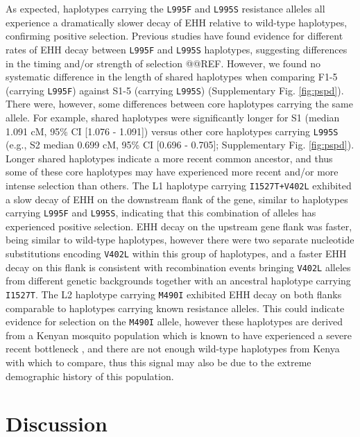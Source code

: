\documentclass[a4paper,11pt,abstracton,hidelinks]{scrartcl}
\begin{document}
%
As expected, haplotypes carrying the \texttt{L995F} and \texttt{L995S} resistance alleles all experience a dramatically slower decay of EHH relative to wild-type haplotypes, confirming positive selection.
%
Previous studies have found evidence for different rates of EHH decay between \texttt{L995F} and \texttt{L995S} haplotypes,
suggesting differences in the timing and/or strength of selection @@REF.
%
However, we found no systematic difference in the length of shared haplotypes when comparing F1-5 (carrying \texttt{L995F}) against S1-5 (carrying \texttt{L995S}) (Supplementary Fig. \ref{fig:pspd}).
%
There were, however, some differences between core haplotypes carrying the same allele.
%
For example, shared haplotypes were significantly longer for S1 (median 1.091 cM, 95\% CI [1.076 - 1.091]) versus other core haplotypes carrying \texttt{L995S} (e.g., S2 median 0.699 cM, 95\% CI [0.696 - 0.705]; Supplementary Fig. \ref{fig:pspd}).
%
Longer shared haplotypes indicate a more recent common ancestor, and thus some of these core haplotypes may have experienced more recent and/or more intense selection than others.
%
The L1 haplotype carrying \texttt{I1527T+V402L} exhibited a slow decay of EHH on the downstream flank of the gene, similar to haplotypes carrying \texttt{L995F} and \texttt{L995S}, indicating that this combination of alleles has experienced positive selection.
%
EHH decay on the upstream gene flank was faster, being similar to wild-type haplotypes, however there were two separate nucleotide substitutions encoding \texttt{V402L} within this group of haplotypes, and a faster EHH decay on this flank is consistent with recombination events bringing \texttt{V402L} alleles from different genetic backgrounds together with an ancestral haplotype carrying \texttt{I1527T}. 
%
The L2 haplotype carrying \texttt{M490I} exhibited EHH decay on both flanks comparable to haplotypes carrying known resistance alleles.
%
This could indicate evidence for selection on the \texttt{M490I} allele, however these haplotypes are derived from a Kenyan mosquito population which is known to have experienced a severe recent bottleneck \cite{Ag1000gConsortium2017}, and there are not enough wild-type haplotypes from Kenya with which to compare, thus this signal may also be due to the extreme demographic history of this population.


\section*{Discussion}
\end{document}
